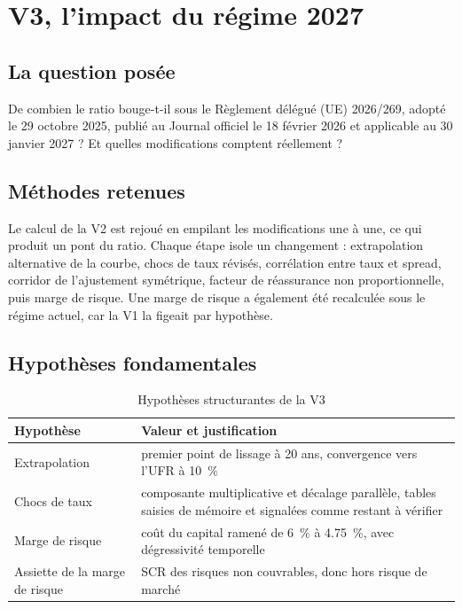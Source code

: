 \documentclass[11pt,a4paper]{article}
\begin{document}
\section{V3, l'impact du régime 2027}

\subsection{La question posée}

De combien le ratio bouge-t-il sous le Règlement délégué (UE) 2026/269, adopté le 29 octobre 2025,
publié au Journal officiel le 18 février 2026 et applicable au 30 janvier 2027 ? Et quelles
modifications comptent réellement ?

\subsection{Méthodes retenues}

Le calcul de la V2 est rejoué en empilant les modifications une à une, ce qui produit un pont du
ratio. Chaque étape isole un changement : extrapolation alternative de la courbe, chocs de taux
révisés, corrélation entre taux et spread, corridor de l'ajustement symétrique, facteur de
réassurance non proportionnelle, puis marge de risque. Une marge de risque a également été
recalculée sous le régime actuel, car la V1 la figeait par hypothèse.

\subsection{Hypothèses fondamentales}

\begin{table}[H]\centering\small
\caption{Hypothèses structurantes de la V3}
\begin{tabularx}{\linewidth}{lX}
\toprule
\textbf{Hypothèse} & \textbf{Valeur et justification}\\
\midrule
Extrapolation & premier point de lissage à 20 ans, convergence vers l'UFR à \qty{10}{\percent}\\
Chocs de taux & composante multiplicative et décalage parallèle, tables saisies de mémoire et
signalées comme restant à vérifier\\
Marge de risque & coût du capital ramené de \qty{6}{\percent} à \qty{4.75}{\percent}, avec
dégressivité temporelle\\
Assiette de la marge de risque & SCR des risques non couvrables, donc hors risque de marché\\
\bottomrule
\end{tabularx}
\end{table}
\end{document}
